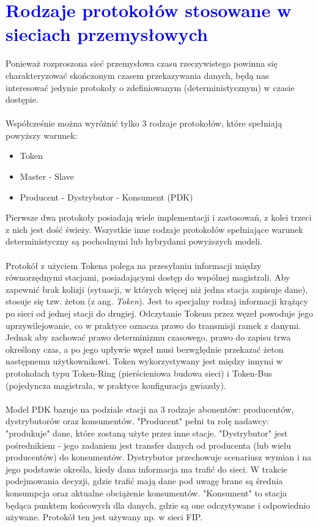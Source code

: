 \documentclass[a4paper,twoside]{article}
\begin{document}
\section{\textcolor{blue}{Rodzaje protokołów stosowane w sieciach przemysłowych}}

Ponieważ rozproszona sieć przemysłowa czasu rzeczywistego powinna się charakteryzować skończonym czasem przekazywania danych, będą nas interesować jedynie protokoły o zdefiniowanym (deterministycznym) w czasie dostępie. \\\\
Współcześnie można wyróżnić tylko 3 rodzaje protokołów, które spełniają powyższy warunek:
\begin{itemize}
	\item Token
	\item Master - Slave
	\item Producent - Dystrybutor - Konsument (PDK)
\end{itemize}
Pierwsze dwa protokoły posiadają wiele implementacji i zastosowań, z kolei trzeci z nich jest dość świeży. Wszystkie inne rodzaje protokołów spełniające warunek deterministyczny są pochodnymi lub hybrydami powyższych modeli. \\\\
Protokół z użyciem Tokena polega na przesyłaniu informacji między równorzędnymi stacjami, posiadającymi dostęp do wspólnej magistrali. Aby zapewnić brak kolizji (sytuacji, w których więcej niż jedna stacja zapisuje dane), stosuje się tzw. żeton (z ang. \textit{Token}). Jest to specjalny rodzaj informacji krążący po sieci od jednej stacji do drugiej. Odczytanie Tokenu przez węzeł powoduje jego uprzywilejowanie, co w praktyce oznacza prawo do transmisji ramek z danymi. Jednak aby zachować prawo determinizmu czasowego, prawo do zapisu trwa określony czas, a po jego upływie węzeł musi bezwględnie przekazać żeton następnemu użytkownikowi. Token wykorzystywany jest między innymi w protokołach typu Token-Ring (pierścieniowa budowa sieci) i Token-Bus (pojedyncza magistrala, w praktyce konfiguracja gwiazdy). \\\\
Model PDK bazuje na podziale stacji na 3 rodzaje abonentów: producentów, dystrybutorów oraz konsumentów. "Producent" pełni tu rolę nadawcy: "produkuje" dane, które zostaną użyte przez inne stacje. "Dystrybutor" jest pośrednikiem - jego zadaniem jest transfer danych od producenta (lub wielu producentów) do konsumentów. Dystrybutor przechowuje scenariusz wymian i na jego podstawie określa, kiedy dana informacja ma trafić do sieci. W trakcie podejmowania decyzji, gdzie trafić mają dane pod uwagę brane są średnia konsumpcja oraz aktualne obciążenie konsumentów. "Konsument" to stacja będąca punktem końcowych dla danych, gdzie są one odczytywane i odpowiednio używane. Protokół ten jest używany np. w sieci FIP.
\end{document}
